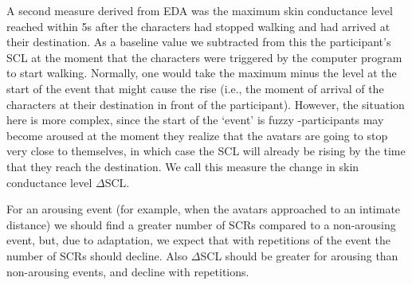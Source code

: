\documentclass[
		twoside,openright,titlepage,numbers=noenddot,manychapters,
		headinclude,%
                footinclude=false,cleardoublepage=empty,
                BCOR=5mm,
		fontsize=11pt, %
                 enabledeprecatedfontcommands]{scrreprt}
\begin{document}
A second measure derived from EDA was the maximum skin conductance level reached within 5s after the characters had stopped walking and had arrived at their destination. As a baseline value we subtracted from this the participant's SCL at the moment that the characters were triggered by the computer program to start walking. Normally, one would take the maximum minus the level at the start of the event that might cause the rise (i.e., the moment of arrival of the characters at their destination in front of the participant). However, the situation here is more complex, since the start of the `event' is fuzzy -participants may become aroused at the moment they realize that the avatars are going to stop very close to themselves, in which case the SCL will already be rising by the time that they reach the destination. We call this measure the change in skin conductance level $\Delta$SCL.

For an arousing event (for example, when the avatars approached to an intimate distance) we should find a greater number of SCRs compared to a non-arousing event, but, due to adaptation, we expect that with repetitions of the event the number of SCRs should decline. Also  $\Delta$SCL should be greater for arousing than non-arousing events, and decline with repetitions.
\end{document}
